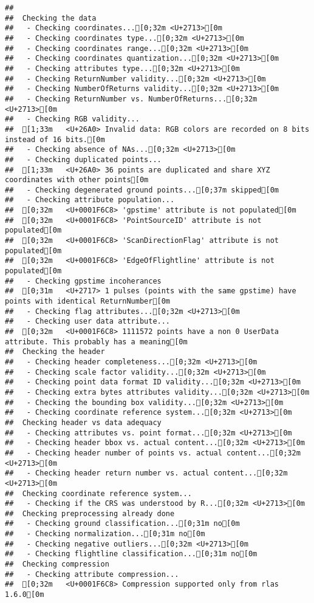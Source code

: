 \documentclass[
]{article}
\begin{document}
\begin{verbatim}
## 
##  Checking the data
##   - Checking coordinates...[0;32m <U+2713>[0m
##   - Checking coordinates type...[0;32m <U+2713>[0m
##   - Checking coordinates range...[0;32m <U+2713>[0m
##   - Checking coordinates quantization...[0;32m <U+2713>[0m
##   - Checking attributes type...[0;32m <U+2713>[0m
##   - Checking ReturnNumber validity...[0;32m <U+2713>[0m
##   - Checking NumberOfReturns validity...[0;32m <U+2713>[0m
##   - Checking ReturnNumber vs. NumberOfReturns...[0;32m <U+2713>[0m
##   - Checking RGB validity...
##  [1;33m   <U+26A0> Invalid data: RGB colors are recorded on 8 bits instead of 16 bits.[0m
##   - Checking absence of NAs...[0;32m <U+2713>[0m
##   - Checking duplicated points...
##  [1;33m   <U+26A0> 36 points are duplicated and share XYZ coordinates with other points[0m
##   - Checking degenerated ground points...[0;37m skipped[0m
##   - Checking attribute population...
##  [0;32m   <U+0001F6C8> 'gpstime' attribute is not populated[0m
##  [0;32m   <U+0001F6C8> 'PointSourceID' attribute is not populated[0m
##  [0;32m   <U+0001F6C8> 'ScanDirectionFlag' attribute is not populated[0m
##  [0;32m   <U+0001F6C8> 'EdgeOfFlightline' attribute is not populated[0m
##   - Checking gpstime incoherances
##  [0;31m   <U+2717> 1 pulses (points with the same gpstime) have points with identical ReturnNumber[0m
##   - Checking flag attributes...[0;32m <U+2713>[0m
##   - Checking user data attribute...
##  [0;32m   <U+0001F6C8> 1111572 points have a non 0 UserData attribute. This probably has a meaning[0m
##  Checking the header
##   - Checking header completeness...[0;32m <U+2713>[0m
##   - Checking scale factor validity...[0;32m <U+2713>[0m
##   - Checking point data format ID validity...[0;32m <U+2713>[0m
##   - Checking extra bytes attributes validity...[0;32m <U+2713>[0m
##   - Checking the bounding box validity...[0;32m <U+2713>[0m
##   - Checking coordinate reference system...[0;32m <U+2713>[0m
##  Checking header vs data adequacy
##   - Checking attributes vs. point format...[0;32m <U+2713>[0m
##   - Checking header bbox vs. actual content...[0;32m <U+2713>[0m
##   - Checking header number of points vs. actual content...[0;32m <U+2713>[0m
##   - Checking header return number vs. actual content...[0;32m <U+2713>[0m
##  Checking coordinate reference system...
##   - Checking if the CRS was understood by R...[0;32m <U+2713>[0m
##  Checking preprocessing already done 
##   - Checking ground classification...[0;31m no[0m
##   - Checking normalization...[0;31m no[0m
##   - Checking negative outliers...[0;32m <U+2713>[0m
##   - Checking flightline classification...[0;31m no[0m
##  Checking compression
##   - Checking attribute compression...
##  [0;32m   <U+0001F6C8> Compression supported only from rlas 1.6.0[0m
\end{verbatim}
\end{document}
